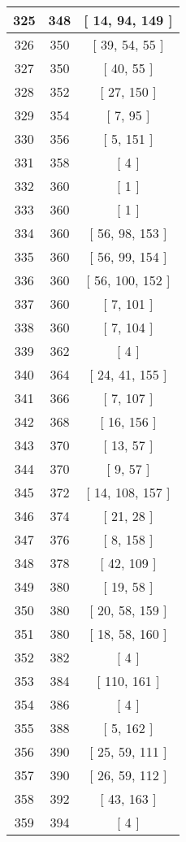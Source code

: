 \begin{center}
\begin{longtable}[H]{|| c c c ||}
\hline
325 & 348 & [ 14, 94, 149 ] \\ 
\hline
326 & 350 & [ 39, 54, 55 ] \\ 
\hline
327 & 350 & [ 40, 55 ] \\ 
\hline
328 & 352 & [ 27, 150 ] \\ 
\hline
329 & 354 & [ 7, 95 ] \\ 
\hline
330 & 356 & [ 5, 151 ] \\ 
\hline
331 & 358 & [ 4 ] \\ 
\hline
332 & 360 & [ 1 ] \\ 
\hline
333 & 360 & [ 1 ] \\ 
\hline
334 & 360 & [ 56, 98, 153 ] \\ 
\hline
335 & 360 & [ 56, 99, 154 ] \\ 
\hline
336 & 360 & [ 56, 100, 152 ] \\ 
\hline
337 & 360 & [ 7, 101 ] \\ 
\hline
338 & 360 & [ 7, 104 ] \\ 
\hline
339 & 362 & [ 4 ] \\ 
\hline
340 & 364 & [ 24, 41, 155 ] \\ 
\hline
341 & 366 & [ 7, 107 ] \\ 
\hline
342 & 368 & [ 16, 156 ] \\ 
\hline
343 & 370 & [ 13, 57 ] \\ 
\hline
344 & 370 & [ 9, 57 ] \\ 
\hline
345 & 372 & [ 14, 108, 157 ] \\ 
\hline
346 & 374 & [ 21, 28 ] \\ 
\hline
347 & 376 & [ 8, 158 ] \\ 
\hline
348 & 378 & [ 42, 109 ] \\ 
\hline
349 & 380 & [ 19, 58 ] \\ 
\hline
350 & 380 & [ 20, 58, 159 ] \\ 
\hline
351 & 380 & [ 18, 58, 160 ] \\ 
\hline
352 & 382 & [ 4 ] \\ 
\hline
353 & 384 & [ 110, 161 ] \\ 
\hline
354 & 386 & [ 4 ] \\ 
\hline
355 & 388 & [ 5, 162 ] \\ 
\hline
356 & 390 & [ 25, 59, 111 ] \\ 
\hline
357 & 390 & [ 26, 59, 112 ] \\ 
\hline
358 & 392 & [ 43, 163 ] \\ 
\hline
359 & 394 & [ 4 ] \\ 

\end{longtable}
\end{center}
